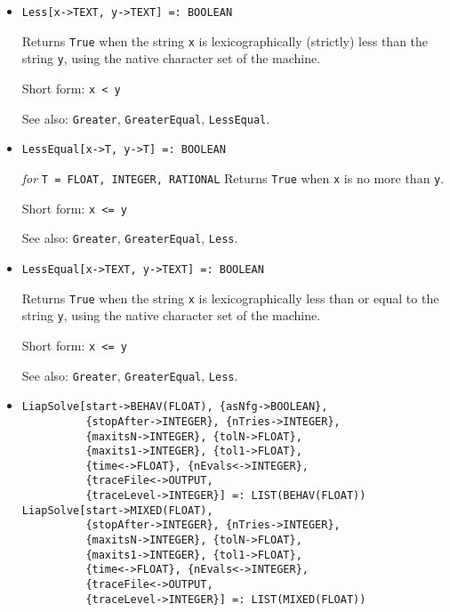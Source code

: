 \begin{itemize}
\item
\protect \large \begin{verbatim}
Less[x->TEXT, y->TEXT] =: BOOLEAN
\end{verbatim}\normalsize

\bd
Returns \verb+True+ when the string \verb+x+ is lexicographically (strictly)
less than
the string \verb+y+, using the native character set of the machine.
\item [Short form:] \verb+x < y+
\item [See also:] \verb+Greater+, \verb+GreaterEqual+, \verb+LessEqual+.
\ed

\item
\protect \large \begin{verbatim}
LessEqual[x->T, y->T] =: BOOLEAN
\end{verbatim}\normalsize

{\it for} {\tt T = FLOAT, INTEGER, RATIONAL}
\bd
Returns \verb+True+ when \verb+x+ is no more than \verb+y+.
\item [Short form:] \verb+x <= y+
\item [See also:] \verb+Greater+, \verb+GreaterEqual+, \verb+Less+.
\ed

\item
\protect \large \begin{verbatim}
LessEqual[x->TEXT, y->TEXT] =: BOOLEAN
\end{verbatim}\normalsize

\bd
Returns \verb+True+ when the string \verb+x+ is lexicographically less than
or equal to the string \verb+y+, using the native character set of the machine.
\item [Short form:] \verb+x <= y+
\item [See also:] \verb+Greater+, \verb+GreaterEqual+, \verb+Less+.
\ed

\item
\protect \large \begin{verbatim}
LiapSolve[start->BEHAV(FLOAT), {asNfg->BOOLEAN},
          {stopAfter->INTEGER}, {nTries->INTEGER},
          {maxitsN->INTEGER}, {tolN->FLOAT},
          {maxits1->INTEGER}, {tol1->FLOAT},
          {time<->FLOAT}, {nEvals<->INTEGER},
          {traceFile<->OUTPUT,
          {traceLevel->INTEGER}] =: LIST(BEHAV(FLOAT))
LiapSolve[start->MIXED(FLOAT), 
          {stopAfter->INTEGER}, {nTries->INTEGER},
          {maxitsN->INTEGER}, {tolN->FLOAT},
          {maxits1->INTEGER}, {tol1->FLOAT},
          {time<->FLOAT}, {nEvals<->INTEGER},
          {traceFile<->OUTPUT, 
          {traceLevel->INTEGER}] =: LIST(MIXED(FLOAT))
\end{verbatim}\normalsize



\end{itemize}
